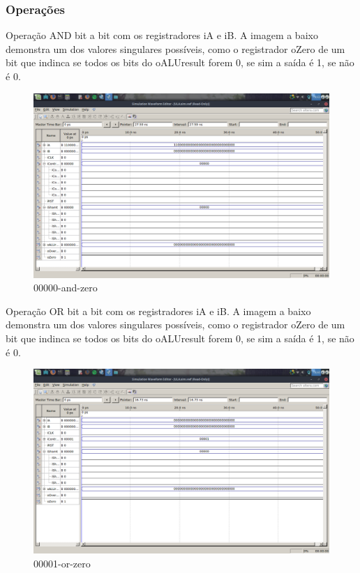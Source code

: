 \documentclass[12pt]{article}
\begin{document}
\subsubsection{Operações}
\label{subsubsec:2op}


	Operação AND bit a bit com os registradores iA e iB.
		A imagem a baixo demonstra um dos valores singulares possíveis, como o registrador oZero de um bit que indinca se todos os bits do oALUresult forem 0, se sim a saída é 1, se não é 0.	 
\begin{figure}[H]
	\centering
	\includegraphics[width=.8\textwidth]{00000-and-zero.png}
	\caption{00000-and-zero}
	\label{fig:00000-and-zero}
\end{figure}
Operação OR bit a bit com os registradores iA e iB.
A imagem a baixo demonstra um dos valores singulares possíveis, como o registrador oZero de um bit que indinca se todos os bits do oALUresult forem 0, se sim a saída é 1, se não é 0.
\begin{figure}[H]
	\centering
	\includegraphics[width=.8\textwidth]{00001-or-zero.png}
	\caption{00001-or-zero}
	\label{fig:00001-or-zero}
\end{figure}
\end{document}
